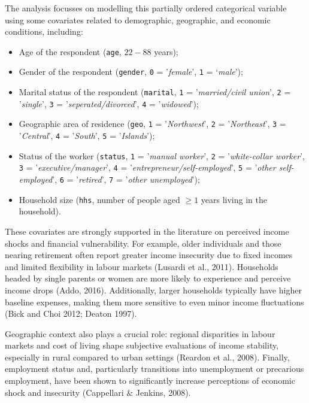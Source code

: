 \documentclass[submit]{smj}
\begin{document}
The analysis focusses on modelling this partially ordered categorical variable using some covariates related to demographic, geographic, and economic conditions, including:
\begin{itemize}
  \item[-] Age of the respondent
    (\texttt{age}, $22-88$ years);
  \item[-] Gender of the respondent
    (\texttt{gender}, \texttt{0} = '\emph{female}', \texttt{1} = `\emph{male}');
  \item[-] Marital status of the respondent 
    (\texttt{marital}, \texttt{1} = '\emph{married/civil union}',
    \texttt{2} = '\emph{single}', \texttt{3} = '\emph{seperated/divorced}',
    \texttt{4} = '\emph{widowed}');
  \item[-] Geographic area of residence
    (\texttt{geo}, \texttt{1} = '\emph{Northwest}',
    \texttt{2} = '\emph{Northeast}', \texttt{3} = '\emph{Central}',
    \texttt{4} = '\emph{South}', \texttt{5} = '\emph{Islands}');
  \item[-] Status of the worker
    (\texttt{status}, \texttt{1} = '\emph{manual worker}',
    \texttt{2} = '\emph{white-collar worker}',
    \texttt{3} = '\emph{executive/manager}',
    \texttt{4} = '\emph{entrepreneur/self-employed}',
    \texttt{5} = '\emph{other self-employed}',
    \texttt{6} = '\emph{retired}',
    \texttt{7} = '\emph{other unemployed}');
  \item[-] Household size (\texttt{hhs}, number of people
    aged $\geq 1$ years living in the household).
\end{itemize}


These covariates are strongly supported in the literature on perceived income shocks and financial vulnerability. For example, older individuals and those nearing retirement often report greater income insecurity due to fixed incomes and limited flexibility in labour markets (Lusardi et al., 2011). Households headed by single parents or women are more likely to experience and perceive income drops (Addo, 2016). Additionally, larger households typically have higher baseline expenses, making them more sensitive to even minor income fluctuations (Bick and Choi 2012; Deaton 1997).

Geographic context also plays a crucial role: regional disparities in labour markets and cost of living shape subjective evaluations of income stability, especially in rural compared to urban settings (Reardon et al., 2008). Finally, employment status and, particularly transitions into unemployment or precarious employment, have been shown to significantly increase perceptions of economic shock and insecurity (Cappellari \& Jenkins, 2008).
\end{document}

